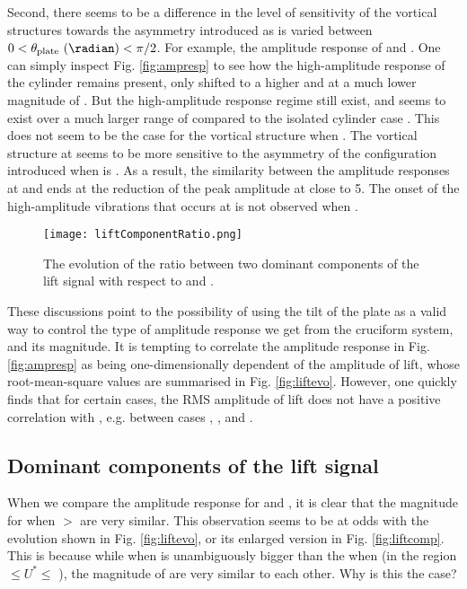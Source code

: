 \documentclass[a4paper]{article}
\begin{document}
Second, there seems to be a difference in the level of sensitivity of the vortical structures towards the asymmetry introduced as \ptlt{} is varied between $0 < \theta_{\text{plate}} \text{ (\radian)} < \pi/2$. For example, the amplitude response of \ptlt{} \es{} \rze{} and \ron{}. One can simply inspect Fig. \ref{fig:ampresp} to see how the high-amplitude response of the cylinder remains present, only shifted to a higher \ured{} and at a much lower magnitude of \yrms{}. But the high-amplitude response regime still exist, and seems to exist over a much larger range of \ured{} compared to the isolated cylinder case \parencite{koide2009novel}. This does not seem to be the case for the vortical structure when \ptlt{} \es{} \rfo{}. The vortical structure at \ptlt{} \es{} \rfo{} seems to be more sensitive to the asymmetry of the configuration introduced when \ptlt{} is \rth{}. As a result, the similarity between the amplitude responses at \ptlt{} \es{} \rth{} and \rfo{} ends at the reduction of the peak amplitude at \ured{} close to 5. The onset of the high-amplitude vibrations that occurs at \ured{} \es{} \urei{} is not observed when \ptlt{} \es{} \rth{}.

\begin{figure}[h]
  \centering
  \texttt{[image: liftComponentRatio.png]}
  \caption{The evolution of the ratio between two dominant components of the lift signal with respect to \ured{} and \ptlt{}.}
  \label{fig:liftcomprat}
\end{figure}

These discussions point to the possibility of using the tilt of the plate as a valid way to control the type of amplitude response we get from the cruciform system, and its magnitude. It is tempting to correlate the amplitude response in Fig. \ref{fig:ampresp} as being one-dimensionally dependent of the amplitude of lift, whose root-mean-square values are summarised in Fig. \ref{fig:liftevo}. However, one quickly finds that for certain cases, the RMS amplitude of lift does not have a positive correlation with \yrms{}, e.g. between cases \ptlt{} \es{} \rtw{}, \rth{}, and \rfo{}.

\subsection{Dominant components of the lift signal}\label{dominantComponents}

When we compare the amplitude response for \ptlt{} \es{} \rtw{} and \rth{}, it is clear that the magnitude for \yrms{} when \ured{} $>$ \urfi{} are very similar. This observation seems to be at odds with the \flrms{} evolution shown in Fig. \ref{fig:liftevo}, or its enlarged version in Fig. \ref{fig:liftcomp}. This is because while \flrms{} when \ptlt{} \es{} \rth{} is unambiguously bigger than the \flrms{} when \ptlt{} \es{} \rtw{} (in the region \urfi{} $\leq U^{*} \leq$ \urtt{}), the magnitude of \yrms{} are very similar to each other. Why is this the case?
\end{document}
